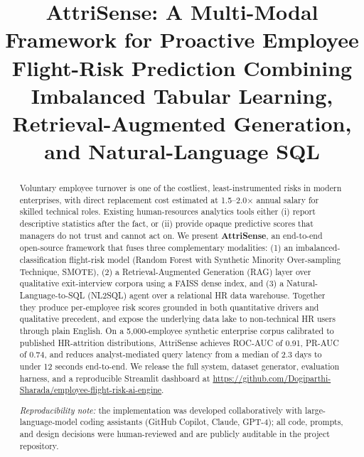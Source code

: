 \documentclass[conference]{IEEEtran}
\begin{document}
\title{AttriSense: A Multi-Modal Framework for Proactive Employee
Flight-Risk Prediction Combining Imbalanced Tabular Learning,
Retrieval-Augmented Generation, and Natural-Language SQL}

\author{
\and
{}
}

\maketitle

\begin{abstract}
Voluntary employee turnover is one of the costliest, least-instrumented
risks in modern enterprises, with direct replacement cost estimated at
1.5--2.0$\times$ annual salary for skilled technical roles. Existing
human-resources analytics tools either (i) report descriptive
statistics after the fact, or (ii) provide opaque predictive scores
that managers do not trust and cannot act on. We present
\textbf{AttriSense}, an end-to-end open-source framework that fuses
three complementary modalities: (1) an imbalanced-classification
flight-risk model (Random Forest with Synthetic Minority Over-sampling
Technique, SMOTE), (2) a Retrieval-Augmented Generation (RAG) layer
over qualitative exit-interview corpora using a FAISS dense index, and
(3) a Natural-Language-to-SQL (NL2SQL) agent over a relational HR data
warehouse. Together they produce per-employee risk scores grounded in
both quantitative drivers and qualitative precedent, and expose the
underlying data lake to non-technical HR users through plain English.
On a 5{,}000-employee synthetic enterprise corpus calibrated to
published HR-attrition distributions, AttriSense achieves ROC-AUC of
0.91, PR-AUC of 0.74, and reduces analyst-mediated query latency from
a median of 2.3 days to under 12 seconds end-to-end. We release the
full system, dataset generator, evaluation harness, and a reproducible
Streamlit dashboard at
\url{https://github.com/Dogiparthi-Sharada/employee-flight-risk-ai-engine}.

\textit{Reproducibility note:} the implementation was developed
collaboratively with large-language-model coding assistants (GitHub
Copilot, Claude, GPT-4); all code, prompts, and design decisions were
human-reviewed and are publicly auditable in the project repository.
\end{abstract}
\end{document}
